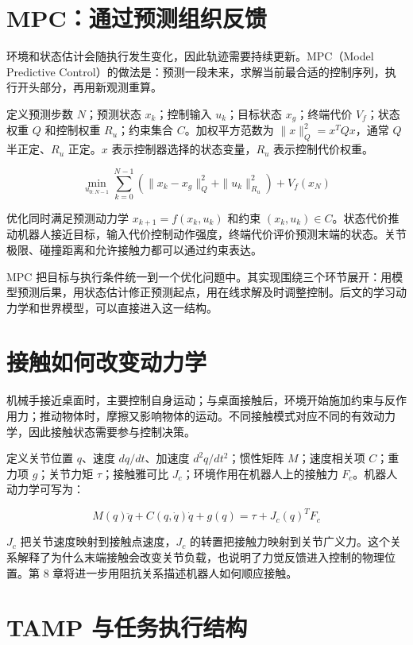 \documentclass[UTF8,a4paper,11pt,oneside,openany,fontset=none]{ctexbook}
\begin{document}
\section{MPC：通过预测组织反馈}\label{mpcux901aux8fc7ux9884ux6d4bux7ec4ux7ec7ux53cdux9988}

环境和状态估计会随执行发生变化，因此轨迹需要持续更新。MPC（Model Predictive Control）的做法是：预测一段未来，求解当前最合适的控制序列，执行开头部分，再用新观测重算。

定义预测步数 \(N\)；预测状态 \(x_{k}\)；控制输入 \(u_{k}\)；目标状态 \(x_{g}\)；终端代价 \(V_{f}\)；状态权重 \(Q\) 和控制权重 \(R_{u}\)；约束集合 \(C\)。加权平方范数为 \(\|x\|_Q^2=x^TQx\)，通常 \(Q\) 半正定、\(R_{u}\) 正定。\(x\) 表示控制器选择的状态变量，\(R_{u}\) 表示控制代价权重。

\[
\min_{u_{0:N-1}}\sum_{k=0}^{N-1}\left(\|x_k-x_g\|_Q^2+\|u_k\|_{R_u}^2\right)+V_f(x_N)
\]

优化同时满足预测动力学 \(x_{k+1}=f(x_k,u_k)\) 和约束 \((x_k,u_k)\in C\)。状态代价推动机器人接近目标，输入代价控制动作强度，终端代价评价预测末端的状态。关节极限、碰撞距离和允许接触力都可以通过约束表达。

MPC 把目标与执行条件统一到一个优化问题中。其实现围绕三个环节展开：用模型预测后果，用状态估计修正预测起点，用在线求解及时调整控制。后文的学习动力学和世界模型，可以直接进入这一结构。

\section{接触如何改变动力学}

机械手接近桌面时，主要控制自身运动；与桌面接触后，环境开始施加约束与反作用力；推动物体时，摩擦又影响物体的运动。不同接触模式对应不同的有效动力学，因此接触状态需要参与控制决策。

定义关节位置 \(q\)、速度 \(dq/dt\)、加速度 \(d^2q/dt^2\)；惯性矩阵 \(M\)；速度相关项 \(C\)；重力项 \(g\)；关节力矩 \(\tau\)；接触雅可比 \(J_{c}\)；环境作用在机器人上的接触力 \(F_{c}\)。机器人动力学可写为：

\[
M(q)\ddot q+C(q,\dot q)\dot q+g(q)=\tau+J_c(q)^T F_c
\]

\(J_{c}\) 把关节速度映射到接触点速度，\(J_{c}\) 的转置把接触力映射到关节广义力。这个关系解释了为什么末端接触会改变关节负载，也说明了力觉反馈进入控制的物理位置。第 8 章将进一步用阻抗关系描述机器人如何顺应接触。

\section{TAMP 与任务执行结构}\label{tamp-ux4e0eux4efbux52a1ux6267ux884cux7ed3ux6784}
\end{document}

